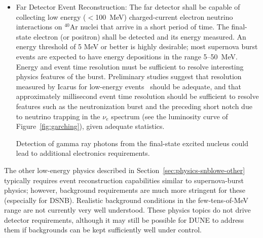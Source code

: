 \begin{itemize}
\item Far Detector Event Reconstruction:   
The far detector shall be capable of collecting low energy ($<$\SI{100}{\MeV})  charged-current electron neutrino interactions on $^{40}$Ar nuclei that arrive in a short period of time. The final-state electron (or positron) shall be detected and its energy measured.   An energy threshold of 5 MeV or better is highly desirable; most supernova burst events are expected to have energy depositions in the range 5--50~MeV.
Energy and event time resolution must be sufficient to resolve interesting physics features of the burst.  Preliminary studies suggest that resolution measured by Icarus for low-energy events~\cite{Amoruso:2003sw} should be adequate, and that approximately millisecond event time resolution should be sufficient to resolve features such as the neutronization burst and the preceding short notch due to neutrino trapping in the $\nu_e$ spectrum (see the luminosity curve of Figure~\ref{fig:garching}), given adequate statistics.   

Detection of gamma ray photons from the final-state excited nucleus could lead to additional electronics requirements.  

\end{itemize}



The other low-energy physics described in Section~\ref{sec:physics-snblowe-other} typically requires event reconstruction capabilities similar to supernova-burst physics; however, background requirements are much more stringent for these (especially for DSNB).  Realistic background conditions in the few-tens-of-MeV range are not currently  very well understood.  
These physics topics do not drive detector requirements, although it may still be possible for DUNE to address them if backgrounds can be kept sufficiently well under control.
